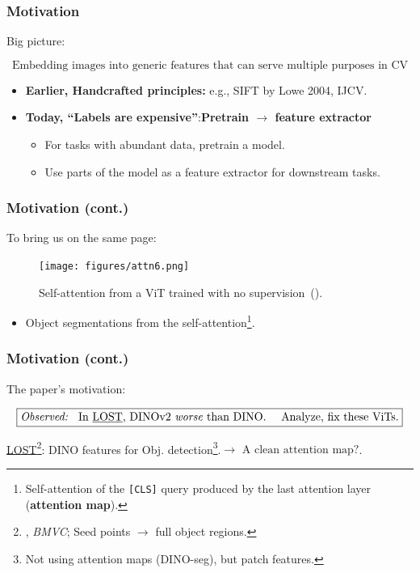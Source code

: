 \documentclass[aspectratio=169]{beamer}
\begin{document}
\begin{frame}
\frametitle{Motivation}
\vspace{4.2em}
Big picture:

$$
\boxed{\text{Embedding images into generic features that can serve multiple purposes in CV}}
$$

\vspace{3.48em}

\begin{itemize}
        \item \textbf{Earlier, Handcrafted principles:} e.g., SIFT by Lowe 2004, IJCV.
        \item \textbf{Today, ``Labels are expensive''}:\textbf{Pretrain $\rightarrow$ feature extractor}
        \begin{itemize}
            \item For tasks with abundant data, pretrain a model.
            \item Use parts of the model as a feature extractor for downstream tasks.
        \end{itemize}
    \end{itemize}

\end{frame}

\begin{frame}
\frametitle{Motivation (cont.)}
To bring us on the same page:

\begin{figure}[h]
    \centering
    \texttt{[image: figures/attn6.png]}
    \caption{Self-attention from a ViT trained with no supervision~(\cite{caronEmergingPropertiesSelfsupervised2021}).}
    \label{fig:attn6}
\end{figure}
\vspace{-1em}
\begin{itemize}
    \item Object segmentations from the self-attention\footnote{Self-attention of the \texttt{[CLS]} query produced by the last attention layer (\textbf{attention map}).}.
\end{itemize}

\end{frame}

\begin{frame}
\frametitle{Motivation (cont.)}
\vspace{4.2em}
The paper's motivation:

$$
\boxed{\text{\emph{Observed: } In \underline{LOST}, DINOv2 \emph{worse} than DINO. } \quad \text{Analyze, fix these ViTs.}}
$$

\vspace{4.2em}
\underline{LOST\footnote{\cite{simeoniLocalizingObjectsSelfsupervised2021}, \textit{BMVC}; Seed points $\rightarrow$ full object regions.}}:
DINO features for Obj. detection\footnote{Not using attention maps (DINO-seg), but patch features.}.\quad $\rightarrow$ \quad $\boxed{\text{A clean attention map?}}$.
\end{frame}
\end{document}
